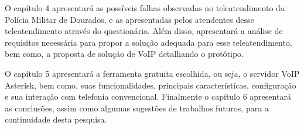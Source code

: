 O capítulo 4 apresentará as possíveis falhas observadas no teleatendimento da Polícia Militar de Dourados, e as apresentadas pelos atendentes desse teleatendimento através do questionário. Além disso, apresentará a análise de requisitos necessária para propor a solução adequada para esse teleatendimento, bem como, a proposta de solução de VoIP detalhando o protótipo.

O capítulo 5 apresentará a ferramenta gratuita escolhida, ou seja, o servidor VoIP Asterisk, bem como, suas funcionalidades, principais características, configuração e sua interação com telefonia convencional. Finalmente o capítulo 6 apresentará as conclusões, assim como algumas sugestões de trabalhos futuros, para a continuidade desta pesquisa.